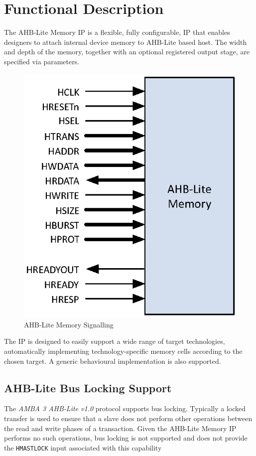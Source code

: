 \chapter{Functional Description} \label{functional-description}

The AHB-Lite Memory IP is a flexible, fully configurable, IP that enables designers to attach internal device memory to AHB-Lite based host. The width and depth of the memory, together with an optional registered output stage, are specified via parameters.

\begin{figure}[th]
	\centering
	\includegraphics{assets/img/AHB-Lite-Memory-PortDiag}
	\caption{AHB-Lite Memory Signalling}
	\label{fig:ahb-lite-memory-portdiag}
\end{figure}

The IP is designed to easily support a wide range of target
technologies, automatically implementing technology-specific memory
cells according to the chosen target. A generic behavioural
implementation is also supported.

\section{AHB-Lite Bus Locking Support} \label{ahb-lite-bus-locking-support}

The \emph{AMBA 3 AHB-Lite v1.0} protocol supports bus locking. Typically a locked transfer is used to ensure that a slave does not perform other operations between the read and write phases of a transaction. Given the AHB-Lite Memory IP performs no such operations, bus locking is not supported and does not provide the \texttt{HMASTLOCK} input associated with this capability